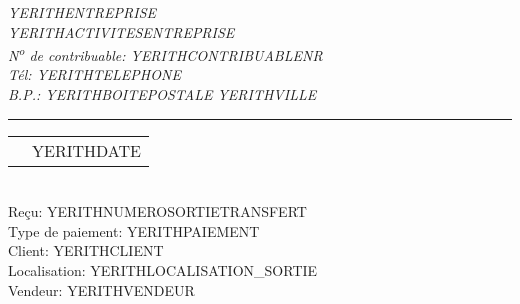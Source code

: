 \documentclass[1.75pt]{article} %
\makeatletter
\newcommand{\headerrow}[2]
{\begin{tabular*}{\linewidth}{l@{\extracolsep{\fill}}r}
	#1 &
	#2 \\
\end{tabular*}}
\makeatother
\begin{document}
\emph{YERITHENTREPRISE} \\
\emph{YERITHACTIVITESENTREPRISE} \\
\emph{N\textsuperscript{o} de contribuable: YERITHCONTRIBUABLENR} \\
\emph{T\'el: YERITHTELEPHONE} \\
\emph{B.P.: YERITHBOITEPOSTALE YERITHVILLE}

\vspace*{0.2cm}

\hrule

\headerrow
{}
{YERITHDATE}\\

Re\c{c}u: YERITHNUMEROSORTIETRANSFERT\\
Type de paiement: YERITHPAIEMENT\\
Client: YERITHCLIENT\\
Localisation: YERITHLOCALISATION_SORTIE\\
Vendeur: YERITHVENDEUR
\vspace*{0.2cm}

\end{document}
